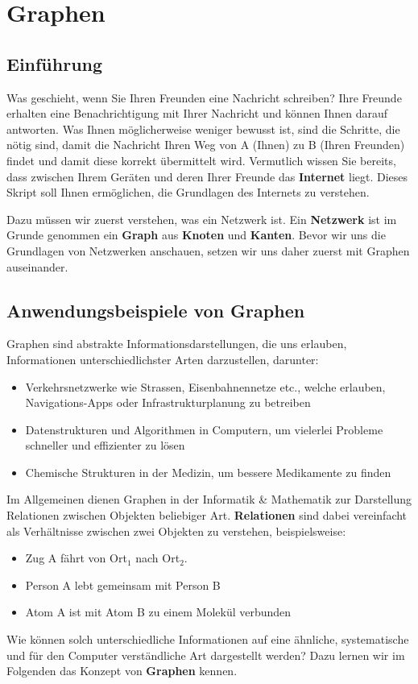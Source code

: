\chapter{Graphen}

\section{Einführung}
Was geschieht, wenn Sie Ihren Freunden eine Nachricht schreiben? Ihre Freunde erhalten eine Benachrichtigung mit Ihrer Nachricht und können Ihnen darauf antworten. Was Ihnen möglicherweise weniger bewusst ist, sind die Schritte, die nötig sind, damit die Nachricht Ihren Weg von A (Ihnen) zu B (Ihren Freunden) findet und damit diese korrekt übermittelt wird. Vermutlich wissen Sie bereits, dass zwischen Ihrem Geräten und deren Ihrer Freunde das \textbf{Internet} liegt. Dieses Skript soll Ihnen ermöglichen, die Grundlagen des Internets zu verstehen.

Dazu müssen wir zuerst verstehen, was ein Netzwerk ist. Ein \textbf{Netzwerk} ist im Grunde genommen ein \textbf{Graph} aus \textbf{Knoten} und \textbf{Kanten}. Bevor wir uns die Grundlagen von Netzwerken anschauen, setzen wir uns daher zuerst mit Graphen auseinander.

\section{Anwendungsbeispiele von Graphen}
Graphen sind abstrakte Informationsdarstellungen, die uns erlauben, Informationen unterschiedlichster Arten darzustellen, darunter:
\begin{itemize}
    \item Verkehrsnetzwerke wie Strassen, Eisenbahnennetze etc., welche erlauben, Navigations-Apps oder Infrastrukturplanung zu betreiben
    \item Datenstrukturen und Algorithmen in Computern, um vielerlei Probleme schneller und effizienter zu lösen
    \item Chemische Strukturen in der Medizin, um bessere Medikamente zu finden
\end{itemize}

Im Allgemeinen dienen Graphen in der Informatik \& Mathematik zur Darstellung Relationen zwischen Objekten beliebiger Art. \textbf{Relationen} sind dabei vereinfacht als Verhältnisse zwischen zwei Objekten zu verstehen, beispielsweise:
\begin{itemize}
\item Zug A fährt von Ort$_1$ nach Ort$_2$.
\item Person A lebt gemeinsam mit Person B
\item Atom A ist mit Atom B zu einem Molekül verbunden
\end{itemize}
Wie können solch unterschiedliche Informationen auf eine ähnliche, systematische und für den Computer verständliche Art dargestellt werden? Dazu lernen wir im Folgenden das Konzept von \textbf{Graphen} kennen.
